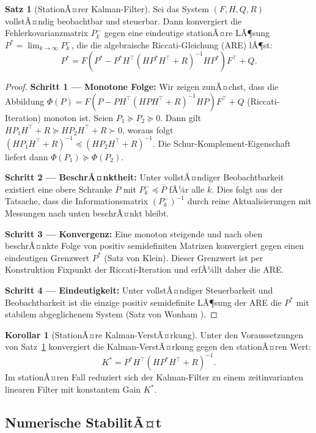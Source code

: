 ﻿\documentclass[a4paper,12pt]{article}
\theoremstyle{definition}
\newtheorem{satz}{Satz}
\newtheorem{korollar}{Korollar}
\begin{document}
\begin{satz}[StationÃ¤rer Kalman-Filter]
\label{satz:stationaer}
    Sei das System $(F, H, Q, R)$ vollstÃ¤ndig beobachtbar und steuerbar.
    Dann konvergiert die Fehlerkovarianzmatrix $P_k^-$ gegen eine eindeutige
    stationÃ¤re LÃ¶sung $P^* = \lim_{k\to\infty} P_k^-$, die die algebraische
    Riccati-Gleichung (ARE) lÃ¶st:
    \[
        P^* = F\left(P^* - P^* H^\top (H P^* H^\top + R)^{-1} H P^*\right) F^\top + Q.
    \]
\end{satz}

\begin{proof}
\textbf{Schritt 1 --- Monotone Folge:}
Wir zeigen zunÃ¤chst, dass die Abbildung
$\Phi(P) = F(P - P H^\top(H P H^\top + R)^{-1} H P)F^\top + Q$
(Riccati-Iteration) monoton ist. Seien $P_1 \succeq P_2 \succeq 0$. Dann gilt
$H P_1 H^\top + R \succeq H P_2 H^\top + R \succ 0$, woraus folgt
$(H P_1 H^\top + R)^{-1} \preceq (H P_2 H^\top + R)^{-1}$.
Die Schur-Komplement-Eigenschaft liefert dann $\Phi(P_1) \succeq \Phi(P_2)$.

\textbf{Schritt 2 --- BeschrÃ¤nktheit:}
Unter vollstÃ¤ndiger Beobachtbarkeit existiert eine obere Schranke $\bar{P}$ mit
$P_k^- \preceq \bar{P}$ fÃ¼r alle $k$. Dies folgt aus der Tatsache, dass die
Informationsmatrix $(P_k^-)^{-1}$ durch reine Aktualisierungen mit Messungen
nach unten beschrÃ¤nkt bleibt.

\textbf{Schritt 3 --- Konvergenz:}
Eine monoton steigende und nach oben beschrÃ¤nkte Folge von positiv semidefiniten
Matrizen konvergiert gegen einen eindeutigen Grenzwert $P^*$ (Satz von Klein).
Dieser Grenzwert ist per Konstruktion Fixpunkt der Riccati-Iteration und erfÃ¼llt
daher die ARE.

\textbf{Schritt 4 --- Eindeutigkeit:}
Unter vollstÃ¤ndiger Steuerbarkeit und Beobachtbarkeit ist die einzige
positiv semidefinite LÃ¶sung der ARE die $P^*$ mit stabilem abgeglichenem System
(Satz von Wonham \cite{wonham1968}).
\end{proof}

\begin{korollar}[StationÃ¤re Kalman-VerstÃ¤rkung]
    Unter den Voraussetzungen von Satz~\ref{satz:stationaer} konvergiert die
    Kalman-VerstÃ¤rkung gegen den stationÃ¤ren Wert:
    \[
        K^* = P^* H^\top (H P^* H^\top + R)^{-1}.
    \]
    Im stationÃ¤ren Fall reduziert sich der Kalman-Filter zu einem zeitinvarianten
    linearen Filter mit konstantem Gain $K^*$.
\end{korollar}

\subsection{Numerische StabilitÃ¤t}
\end{document}
